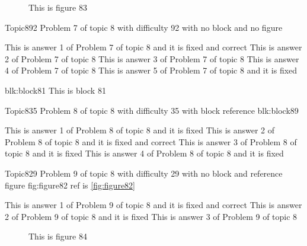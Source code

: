 \documentclass[master]{exam}
\begin{document}
\begin{figure}
	\begin{center}
		This is figure 83 
		\label{fig:figure83}
	\end{center}
\end{figure}

\begin{problem}{Topic8}{92}
	Problem 7 of topic 8 with difficulty 92 with no block and no figure
	\begin{answers}
		 This is answer 1 of Problem 7 of topic 8 and it is fixed and correct
		\answer This is answer 2 of Problem 7 of topic 8 
		\answer This is answer 3 of Problem 7 of topic 8 
		\answer This is answer 4 of Problem 7 of topic 8 
		\answer[fixed] This is answer 5 of Problem 7 of topic 8 and it is fixed
	\end{answers}
\end{problem}



\begin{block}{blk:block81}
This is block 81
\end{block}


\begin{problem}[requires=blk:block89]{Topic8}{35}
	Problem 8 of topic 8 with difficulty 35 with block reference blk:block89
	\begin{answers}
		\answer[fixed] This is answer 1 of Problem 8 of topic 8 and it is fixed
		 This is answer 2 of Problem 8 of topic 8 and it is fixed and correct
		\answer[fixed] This is answer 3 of Problem 8 of topic 8 and it is fixed
		\answer[fixed] This is answer 4 of Problem 8 of topic 8 and it is fixed
	\end{answers}
\end{problem}

\begin{problem}{Topic8}{29}
	Problem 9 of topic 8 with difficulty 29 with no block and reference figure fig:figure82 ref is \ref{fig:figure82}
	\begin{answers}
		 This is answer 1 of Problem 9 of topic 8 and it is fixed and correct
		\answer[fixed] This is answer 2 of Problem 9 of topic 8 and it is fixed
		\answer This is answer 3 of Problem 9 of topic 8 
	\end{answers}
\end{problem}



\begin{figure}
	\begin{center}
		This is figure 84 
		\label{fig:figure84}
	\end{center}
\end{figure}
\end{document}
